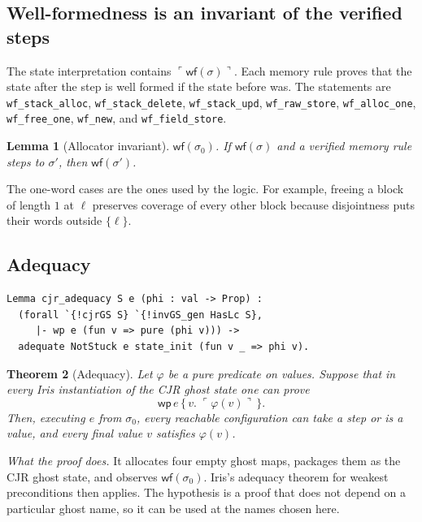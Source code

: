 \documentclass[11pt]{article}
\newtheorem{theorem}{Theorem}
\newtheorem{lemma}[theorem]{Lemma}
\newcommand{\cjr}{CJR}
\newcommand{\WF}{\mathsf{wf}}
\newcommand{\Wpre}{\mathsf{wp}}
\newcommand{\pure}[1]{\ulcorner #1 \urcorner}
\begin{document}
\subsection{Well-formedness is an invariant of the verified steps}

The state interpretation contains \(\pure{\WF(\sigma)}\).
Each memory rule proves that the state after the step is well formed if the state before was.
The statements are \texttt{wf\_stack\_alloc}, \texttt{wf\_stack\_delete}, \texttt{wf\_stack\_upd}, \texttt{wf\_raw\_store}, \texttt{wf\_alloc\_one}, \texttt{wf\_free\_one}, \texttt{wf\_new}, and \texttt{wf\_field\_store}.

\begin{lemma}[Allocator invariant]
\(\WF(\sigma_0)\).
If \(\WF(\sigma)\) and a verified memory rule steps to \(\sigma'\), then \(\WF(\sigma')\).
\end{lemma}

The one-word cases are the ones used by the logic.
For example, freeing a block of length \(1\) at \(\ell\) preserves coverage of every other block because disjointness puts their words outside \(\{\ell\}\).

\subsection{Adequacy}

\begin{lstlisting}
Lemma cjr_adequacy S e (phi : val -> Prop) :
  (forall `{!cjrGS S} `{!invGS_gen HasLc S},
     |- wp e (fun v => pure (phi v))) ->
  adequate NotStuck e state_init (fun v _ => phi v).
\end{lstlisting}

\begin{theorem}[Adequacy]
Let \(\varphi\) be a pure predicate on values.
Suppose that in every Iris instantiation of the \cjr{} ghost state one can prove
\[
\Wpre\,e\,\{\,v.\; \pure{\varphi(v)}\,\}.
\]
Then, executing \(e\) from \(\sigma_0\), every reachable configuration can take a step or is a value, and every final value \(v\) satisfies \(\varphi(v)\).
\end{theorem}

\noindent\textit{What the proof does.}
It allocates four empty ghost maps, packages them as the \cjr{} ghost state, and observes \(\WF(\sigma_0)\).
Iris's adequacy theorem for weakest preconditions then applies.
The hypothesis is a proof that does not depend on a particular ghost name, so it can be used at the names chosen here.
\end{document}
